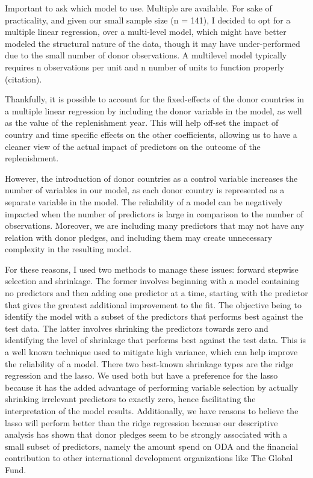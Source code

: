 \documentclass[
]{article}
\begin{document}
Important to ask which model to use. Multiple are available. For sake of
practicality, and given our small sample size (n = 141), I decided to
opt for a multiple linear regression, over a multi-level model, which
might have better modeled the structural nature of the data, though it
may have under-performed due to the small number of donor observations.
A multilevel model typically requires n observations per unit and n
number of units to function properly (citation).

Thankfully, it is possible to account for the fixed-effects of the donor
countries in a multiple linear regression by including the donor
variable in the model, as well as the value of the replenishment year.
This will help off-set the impact of country and time specific effects
on the other coefficients, allowing us to have a cleaner view of the
actual impact of predictors on the outcome of the replenishment.

However, the introduction of donor countries as a control variable
increases the number of variables in our model, as each donor country is
represented as a separate variable in the model. The reliability of a
model can be negatively impacted when the number of predictors is large
in comparison to the number of observations. Moreover, we are including
many predictors that may not have any relation with donor pledges, and
including them may create unnecessary complexity in the resulting model.

For these reasons, I used two methods to manage these issues: forward
stepwise selection and shrinkage. The former involves beginning with a
model containing no predictors and then adding one predictor at a time,
starting with the predictor that gives the greatest additional
improvement to the fit. The objective being to identify the model with a
subset of the predictors that performs best against the test data. The
latter involves shrinking the predictors towards zero and identifying
the level of shrinkage that performs best against the test data. This is
a well known technique used to mitigate high variance, which can help
improve the reliability of a model. There two best-known shrinkage types
are the ridge regression and the lasso. We used both but have a
preference for the lasso because it has the added advantage of
performing variable selection by actually shrinking irrelevant
predictors to exactly zero, hence facilitating the interpretation of the
model results. Additionally, we have reasons to believe the lasso will
perform better than the ridge regression because our descriptive
analysis has shown that donor pledges seem to be strongly associated
with a small subset of predictors, namely the amount spend on ODA and
the financial contribution to other international development
organizations like The Global Fund.
\end{document}
